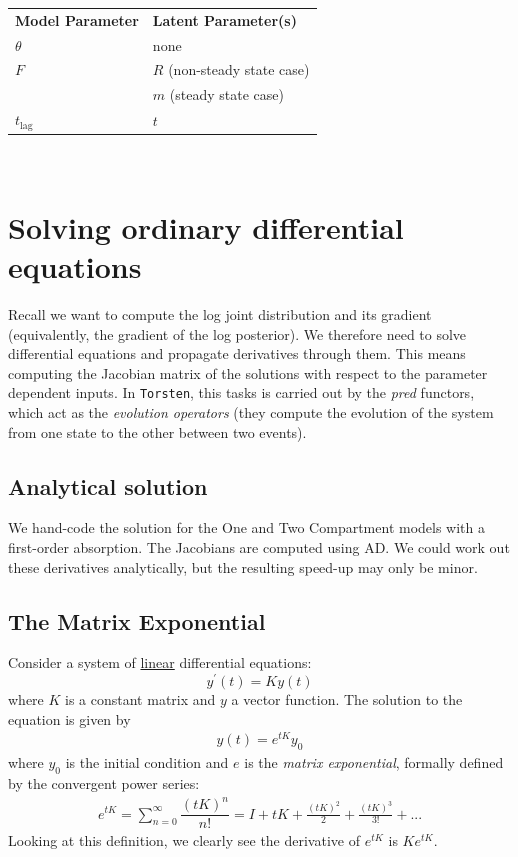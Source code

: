 \documentclass[11pt]{article}
\begin{document}
\begin{center}
  \begin{tabular}{l l}
  \rowcolor[gray]{0.95} \textbf{Model Parameter} & \textbf{Latent Parameter(s)} \\
   $\theta$ & none \\
 \rowcolor[gray]{0.95}  $F$ & $R$ (non-steady state case) \\
  \rowcolor[gray]{0.95}       &  $m$  (steady state case) \\ 
   $t_\mathrm{lag}$ & $t$ \\
  
  \end{tabular} \\
\end{center}


\section{Solving ordinary differential equations}

Recall we want to compute the log joint distribution and its gradient (equivalently,
the gradient of the log posterior). We therefore need to solve differential equations and propagate 
derivatives through them.
%
This means computing the Jacobian matrix of the solutions with
respect to the parameter dependent inputs. In \texttt{Torsten}, this tasks is carried out by the \textit{pred} functors,
which act as the \textit{evolution operators} (they compute the evolution of the system from
one state to the other between two events).

\subsection{Analytical solution}

We hand-code the solution for the One and Two Compartment models with a first-order
absorption. The Jacobians are computed using AD.
We could work out these derivatives analytically, but the resulting speed-up may
only be minor. 

\subsection{The Matrix Exponential}

Consider a system of \underline{linear} differential equations:
%
$$ y^\prime(t) = Ky(t) $$
%
where $K$ is a constant matrix and $y$ a vector function. The solution to the equation is given by 
%
\begin{eqnarray}
  y(t) = e^{tK} y_0
  \label{eq:linearSol}
\end{eqnarray}
%
where $y_0$ is the initial condition and $e$ is the \textit{matrix exponential}, formally defined
by the convergent power series:
%
\begin{eqnarray}
  e^{tK} = \sum_{n=0}^{\infty} \dfrac{(tK)^n}{n!} = I + tK + \frac{(tK)^2}{2} + \frac{(tK)^3}{3!} + ...
  \label{eq:matrix_exp}
\end{eqnarray}
%
Looking at this definition, we clearly see the derivative of $e^{tK}$ is $Ke^{tK}$.
\end{document}
